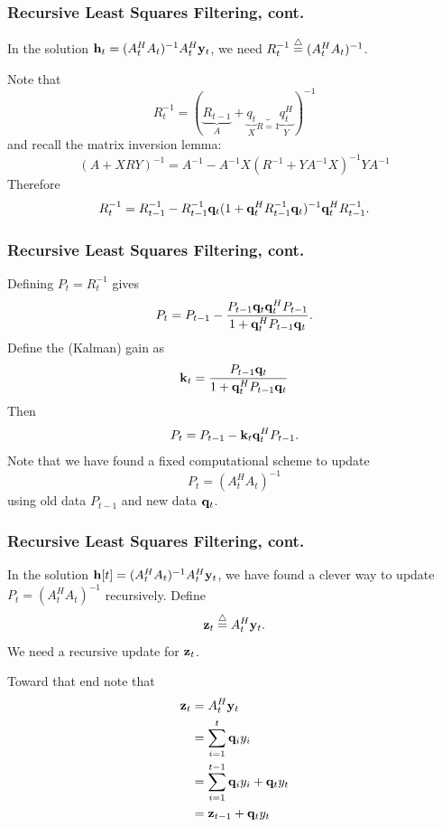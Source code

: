 \documentclass{beamer}
\begin{document}
\begin{frame}\frametitle{Recursive Least Squares Filtering, cont.}
	In the solution $\mathbf{h}_t = (A_t^H A_t)^{-1} A_t^H \mathbf{y}_t$, we need $R_t^{-1} \stackrel{\triangle}{=} (A_t^H A_t)^{-1}$.
	
	Note that 
		\[R_t^{-1} = (\underbrace{R_{t-1}}_{A} + \underbrace{q_t}_{X}\underbrace{}_{R=1}\underbrace{q_t^H}_{Y})^{-1}\] 
	and recall the matrix inversion lemma:
		\[ (A + XRY)^{-1} = A^{-1} - A^{-1}X(R^{-1}+YA^{-1}X)^{-1}YA^{-1} \]
	Therefore
		\[R_t^{-1} = R_{t-1}^{-1} - R^{-1}_{t-1} \mathbf{q}_t(1 + \mathbf{q}_t^H R^{-1}_{t-1} \mathbf{q}_t)^{-1}\mathbf{q}_t^H R^{-1}_{t-1}.\]
\end{frame}

\begin{frame}\frametitle{Recursive Least Squares Filtering, cont.}

	Defining $P_t = R_t^{-1}$ gives
		\[
		P_t = P_{t-1} - \frac{P_{t-1} \mathbf{q}_t \mathbf{q}_t^H P_{t-1}}{1 + \mathbf{q}_t^H P_{t-1} \mathbf{q}_t}.
		\]
	Define the (Kalman) gain as
		\[ 
		\mathbf{k}_t = \frac{P_{t-1} \mathbf{q}_t}{1 + \mathbf{q}_t^H P_{t-1} \mathbf{q}_t}
		\]
	Then
	\[ 
	P_t = P_{t-1} - \mathbf{k}_t \mathbf{q}_t^H P_{t-1}. 
	\]
	Note that we have found a fixed computational scheme to update
	\[
	P_t = (A_t^H A_t)^{-1} 
	\]
	using old data $P_{t-1}$ and new data $\mathbf{q}_t$.
\end{frame}


\begin{frame}\frametitle{Recursive Least Squares Filtering, cont.}
		In the solution $\mathbf{h}[t] = (A_t^H A_t)^{-1} A_t^H \mathbf{y}_t$, we have found a clever way to update $P_t=(A_t^H A_t)^{-1}$ recursively.  Define
		\[
		\mathbf{z}_t \stackrel{\triangle}{=} A_t^H \mathbf{y}_t.
		\]
		We need a recursive update for $\mathbf{z}_t$.
		
		Toward that end note that
		\begin{align*}
			\mathbf{z}_t &= A_t^H \mathbf{y}_t \\
			 	&= \sum_{i=1}^t \mathbf{q}_i y_i \\
			 	&= \sum_{i=1}^{t-1} \mathbf{q}_i y_i + \mathbf{q}_t y_t \\
				&= \mathbf{z}_{t-1} + \mathbf{q}_t y_t
		\end{align*}
\end{frame}
\end{document}
